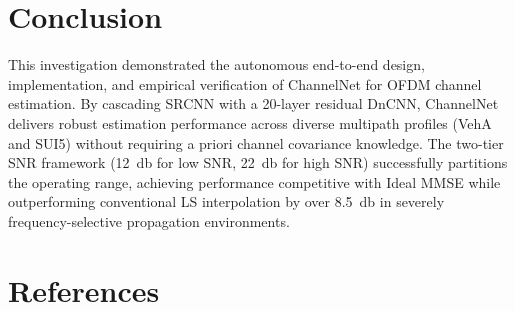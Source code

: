 \documentclass[10pt,a4paper]{article}
\begin{document}
\section{Conclusion}
\label{sec:conclusion}
This investigation demonstrated the autonomous end-to-end design, implementation, and empirical verification of ChannelNet for OFDM channel estimation. By cascading SRCNN with a 20-layer residual DnCNN, ChannelNet delivers robust estimation performance across diverse multipath profiles (VehA and SUI5) without requiring a priori channel covariance knowledge. The two-tier SNR framework (\SI{12}{\decibel} for low SNR, \SI{22}{\decibel} for high SNR) successfully partitions the operating range, achieving performance competitive with Ideal MMSE while outperforming conventional LS interpolation by over \SI{8.5}{\decibel} in severely frequency-selective propagation environments.

\section{References}
\label{sec:references}
\begingroup
\renewcommand{\section}[2]{} %


\endgroup
\end{document}
